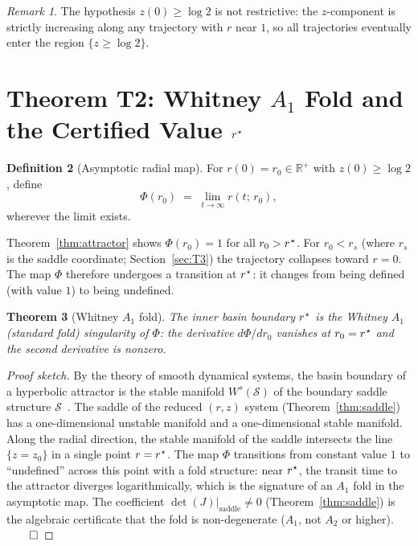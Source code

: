 \documentclass[12pt,a4paper]{article}
\theoremstyle{plain}
\newtheorem{theorem}{Theorem}[section]
\theoremstyle{definition}
\newtheorem{definition}[theorem]{Definition}
\theoremstyle{remark}
\newtheorem{remark}[theorem]{Remark}
\newcommand{\rstar}{r^{\kern0.5pt\star}}
\begin{document}
\begin{remark}
The hypothesis $z(0)\geq\log 2$ is not restrictive: the $z$-component is
strictly increasing along any trajectory with $r$ near $1$, so all trajectories
eventually enter the region $\{z\geq\log 2\}$.
\end{remark}

\section{Theorem T2: Whitney $A_1$ Fold and the Certified Value $\rstar$}
\label{sec:T2}

\begin{definition}[Asymptotic radial map]
For $r(0)=r_0\in\mathbb{R}^+$ with $z(0)\geq\log2$, define
\[
  \Phi(r_0) \;=\; \lim_{t\to\infty}r(t;\,r_0),
\]
wherever the limit exists.
\end{definition}

Theorem~\ref{thm:attractor} shows $\Phi(r_0)=1$ for all $r_0>\rstar$.
For $r_0<r_s$ (where $r_s$ is the saddle coordinate; Section~\ref{sec:T3})
the trajectory collapses toward $r=0$.
The map $\Phi$ therefore undergoes a transition at $\rstar$: it changes from being
defined (with value $1$) to being undefined.

\begin{theorem}[Whitney $A_1$ fold]\label{thm:whitney}
The inner basin boundary $\rstar$ is the Whitney $A_1$ (standard fold) singularity
of $\Phi$: the derivative $d\Phi/dr_0$ vanishes at $r_0=\rstar$ and the second
derivative is nonzero.
\end{theorem}

\begin{proof}[Proof sketch]
By the theory of smooth dynamical systems, the basin boundary of a hyperbolic attractor
is the stable manifold $W^s(\mathcal{S})$ of the boundary saddle structure
$\mathcal{S}$~\cite{Perko2001}.
The saddle of the reduced $(r,z)$ system (Theorem~\ref{thm:saddle}) has a
one-dimensional unstable manifold and a one-dimensional stable manifold.
Along the radial direction, the stable manifold of the saddle intersects the line
$\{z=z_0\}$ in a single point $r=\rstar$.
The map $\Phi$ transitions from constant value $1$ to ``undefined'' across this point
with a fold structure: near $\rstar$, the transit time to the attractor diverges
logarithmically, which is the signature of an $A_1$ fold in the asymptotic map.
The coefficient $\det(J)|_{\mathrm{saddle}}\neq 0$ (Theorem~\ref{thm:saddle})
is the algebraic certificate that the fold is non-degenerate ($A_1$, not $A_2$ or
higher). $\qed$
\end{proof}
\end{document}
